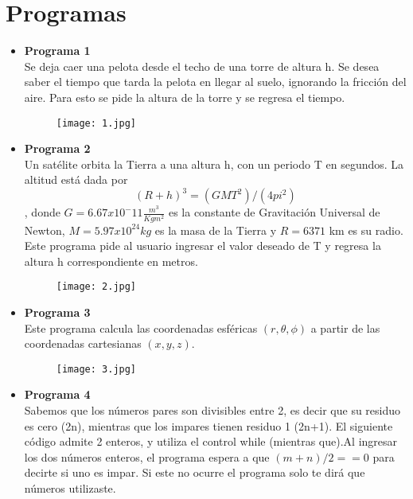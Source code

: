 \documentclass[a4paper]{article}
\begin{document}
\section{Programas}
\begin{itemize}
\item \textbf{Programa 1} \\ 
Se deja caer una pelota desde el techo de una torre de altura h. Se desea saber el tiempo que tarda la pelota en llegar al suelo, ignorando la fricción del aire. Para esto se pide la altura de la torre y se regresa el tiempo.



\begin{figure}[H]
	\centering
	\texttt{[image: 1.jpg]}
\end{figure}

\item \textbf{Programa 2} \\
Un satélite orbita la Tierra a una altura h, con un periodo T en segundos. La altitud está dada por $$(R + h)^3 = (GMT^2)/(4 pi^2) $$, donde $G = 6.67 x 10^-11 \frac{m^3}{Kg m^2}$ es la constante de Gravitación Universal de Newton, $M = 5.97 x 10^24 kg$ es la masa de la Tierra y $R=6371$ km es su radio.
Este programa pide al usuario ingresar el valor deseado de T y regresa la altura h correspondiente en metros.



\begin{figure}[H]
	\centering
	\texttt{[image: 2.jpg]}
\end{figure}

\item \textbf{Programa 3} \\
Este programa calcula las coordenadas esféricas $(r, \theta, \phi)$ a partir de las coordenadas cartesianas $(x,y,z)$.

\begin{figure}[H]
	\centering
	\texttt{[image: 3.jpg]}
\end{figure}

\item \textbf{Programa 4} \\
Sabemos que los números pares son divisibles entre 2, es decir que su residuo es cero (2n), mientras que los impares tienen residuo 1 (2n+1). El siguiente código admite 2 enteros, y utiliza el control while (mientras que).Al ingresar los dos números enteros, el programa espera a que $(m+n)/2==0$ para decirte si uno es impar. Si este no ocurre el programa solo te dirá que números utilizaste.



\end{itemize}
\end{document}
